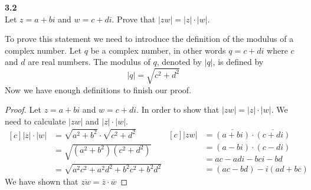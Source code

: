 \documentclass[12pt]{article}
\begin{document}
  
  \textbf{3.2} \\  %
  Let $z = a + bi$ and $w = c + di $. Prove that $\lvert zw \rvert = \lvert z \rvert \cdot \lvert w \rvert$.
  
  
  To prove this statement we need to introduce the definition of the modulus of a complex number. Let $q$ be a complex number, in other words $q = c + di$ where $c$ and $d$ are real numbers. The modulus of $q$, denoted by $\lvert q \rvert$, is defined by $$\lvert q \rvert= \sqrt{c^2 + d^2}$$
  Now we have enough definitions to finish our proof.
  \begin{proof}
    
    Let $z = a + bi$ and $w = c + di $. In order to show that  $\lvert zw \rvert = \lvert z \rvert \cdot \lvert w \rvert$. We need to calculate $\lvert zw \rvert$ and $\lvert z \rvert \cdot \lvert w \rvert.$
    \begin{equation*}
      \begin{aligned}[c]
        \lvert z \rvert \cdot \lvert w \rvert &= \sqrt{a^2 + b^2} \cdot \sqrt{c^2 + d^2} \\ 
         &= \sqrt{(a^2 + b^2)(c^2 + d^2)}\\
         &= \sqrt{a^2c^2 + a^2d^2 + b^2c^2+b^2d^2}
      \end{aligned}
      \begin{aligned}[c]
        \lvert zw \rvert &= \overline{(a+bi)} \cdot \overline{(c+di)} \\ 
         &= (a-bi) \cdot (c-di)\\
         &= ac -adi-bci-bd\\
         &= (ac-bd)-i(ad+bc)  
      \end{aligned}
    \end{equation*}
    We have shown that $\overline{zw} = \overline{z} \cdot \overline{w}$
      
        
        
  
      
  \end{proof}
\end{document}
